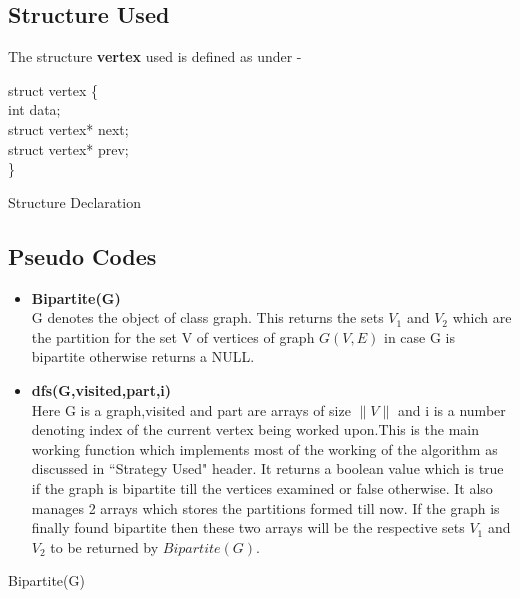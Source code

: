 \documentclass[20pt]{article}
\begin{document}
\newcommand\mycommfont[1]{\small\ttfamily\textcolor{blue}{#1}}

\subsection{Structure Used}

The structure \textbf{vertex} used is defined as under -
\begin{algorithm}

	struct vertex \{ \\
		\hspace{1cm} int data; \\
		\hspace{1cm} struct vertex* next; \\
		\hspace{1cm} struct vertex* prev; \\
	\}

	\caption{Structure Declaration}

\end{algorithm}

\subsection{Pseudo Codes}

\begin{itemize}
\item \textbf{Bipartite(G)} \\
G denotes the object of class graph. This returns the sets $V_1$ and $V_2$ which are the partition for the set V of vertices of graph $G(V,E)$ in case G is bipartite otherwise returns a NULL.
\item \textbf{dfs(G,visited,part,i)} \\
Here G is a graph,visited and part are arrays of size $\|V\|$ and i is a number denoting index of the current vertex being worked upon.This is the main working function which implements most of the working of the algorithm as discussed in ``Strategy Used" header. It returns a boolean value which is true if the graph is bipartite till the vertices examined or false otherwise. It also manages 2 arrays which stores the partitions formed till now. If the graph is finally found bipartite then these two arrays will be the respective sets $V_1$ and $V_2$ to be returned by $Bipartite(G)$.
\end{itemize}

\begin{algorithm}


	\caption{Bipartite(G)}
\end{algorithm}
\end{document}
